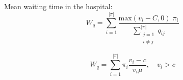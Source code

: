 \newpage
Mean waiting time in the hospital:
\begin{equation}
    W_q = \sum_{i=1}^{|\pi|} \frac{\text{max}(v_i - C, 0) \; \pi_i}{\sum_{\substack{j=1 \\ i \neq j}}^{|\pi|} q_{i j}}
\end{equation}

\begin{equation}
    W_q = \sum_{i=1}^{|\pi|} \pi_i \frac{v_i - c}{v_i \mu}, \quad v_i > c
\end{equation}
